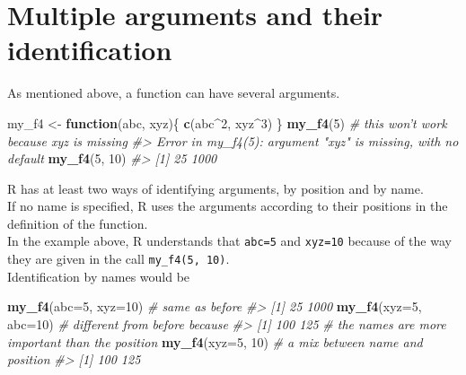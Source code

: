 \documentclass[]{book}
\newenvironment{Shaded}{}{}
\newcommand{\CommentTok}[1]{\textcolor[rgb]{0.38,0.63,0.69}{\textit{#1}}}
\newcommand{\ControlFlowTok}[1]{\textcolor[rgb]{0.00,0.44,0.13}{\textbf{#1}}}
\newcommand{\DataTypeTok}[1]{\textcolor[rgb]{0.56,0.13,0.00}{#1}}
\newcommand{\DecValTok}[1]{\textcolor[rgb]{0.25,0.63,0.44}{#1}}
\newcommand{\KeywordTok}[1]{\textcolor[rgb]{0.00,0.44,0.13}{\textbf{#1}}}
\newcommand{\NormalTok}[1]{#1}
\newcommand{\OperatorTok}[1]{\textcolor[rgb]{0.40,0.40,0.40}{#1}}
\newcommand{\StringTok}[1]{\textcolor[rgb]{0.25,0.44,0.63}{#1}}
\theoremstyle{definition}
\theoremstyle{definition}
\theoremstyle{definition}
\theoremstyle{remark}
\begin{document}
\hypertarget{multiple-arguments-and-their-identification}{%
\section{Multiple arguments and their
identification}\label{multiple-arguments-and-their-identification}}

As mentioned above, a function can have several arguments.

\begin{Shaded}
\begin{Highlighting}[]
\NormalTok{my_f4 <-}\StringTok{ }\ControlFlowTok{function}\NormalTok{(abc, xyz)\{}
  \KeywordTok{c}\NormalTok{(abc}\OperatorTok{^}\DecValTok{2}\NormalTok{, xyz}\OperatorTok{^}\DecValTok{3}\NormalTok{)}
\NormalTok{\}}
\KeywordTok{my_f4}\NormalTok{(}\DecValTok{5}\NormalTok{) }\CommentTok{# this won't work because xyz is missing}
\CommentTok{#> Error in my_f4(5): argument "xyz" is missing, with no default}
\KeywordTok{my_f4}\NormalTok{(}\DecValTok{5}\NormalTok{, }\DecValTok{10}\NormalTok{)}
\CommentTok{#> [1]   25 1000}
\end{Highlighting}
\end{Shaded}

R has at least two ways of identifying arguments, by position and by
name.\\
If no name is specified, R uses the arguments according to their
positions in the definition of the function.\\
In the example above, R understands that \texttt{abc=5} and
\texttt{xyz=10} because of the way they are given in the call
\texttt{my\_f4(5,\ 10)}.\\
Identification by names would be

\begin{Shaded}
\begin{Highlighting}[]
\KeywordTok{my_f4}\NormalTok{(}\DataTypeTok{abc=}\DecValTok{5}\NormalTok{, }\DataTypeTok{xyz=}\DecValTok{10}\NormalTok{) }\CommentTok{# same as before}
\CommentTok{#> [1]   25 1000}
\KeywordTok{my_f4}\NormalTok{(}\DataTypeTok{xyz=}\DecValTok{5}\NormalTok{, }\DataTypeTok{abc=}\DecValTok{10}\NormalTok{) }\CommentTok{# different from before because}
\CommentTok{#> [1] 100 125}
\CommentTok{# the names are more important than the position}
\KeywordTok{my_f4}\NormalTok{(}\DataTypeTok{xyz=}\DecValTok{5}\NormalTok{, }\DecValTok{10}\NormalTok{) }\CommentTok{# a mix between name and position }
\CommentTok{#> [1] 100 125}
\end{Highlighting}
\end{Shaded}
\end{document}
